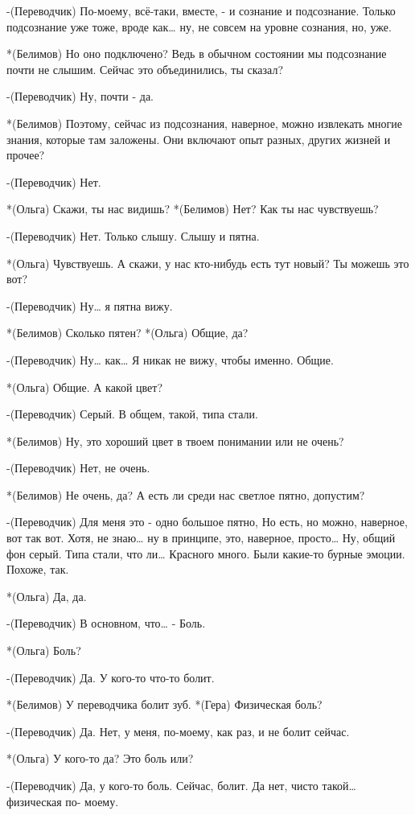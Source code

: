 -(Переводчик) По-моему, всё-таки, вместе, - и сознание и подсознание. Только подсознание уже тоже, вроде как… ну, не совсем на уровне сознания, но, уже.

*(Белимов) Но оно подключено? Ведь в обычном состоянии мы подсознание почти не слышим. Сейчас это объединились, ты сказал?

-(Переводчик) Ну, почти - да.

*(Белимов) Поэтому, сейчас из подсознания, наверное, можно извлекать многие знания, которые там заложены. Они включают опыт разных, других жизней и прочее?

-(Переводчик) Нет.

*(Ольга) Скажи, ты нас видишь?
*(Белимов) Нет? Как ты нас чувствуешь?

-(Переводчик) Нет. Только слышу. Слышу и пятна. 

*(Ольга) Чувствуешь. А скажи, у нас кто-нибудь есть тут новый? Ты можешь это вот?

-(Переводчик) Ну… я пятна вижу. 

*(Белимов) Сколько пятен?
*(Ольга) Общие, да?

-(Переводчик) Ну… как…  Я никак не вижу, чтобы именно. Общие.

*(Ольга) Общие. А какой цвет?

-(Переводчик) Серый.  В общем, такой, типа стали. 

*(Белимов) Ну, это хороший цвет в твоем понимании или не очень?

-(Переводчик) Нет, не очень.

*(Белимов) Не очень, да? А есть ли среди нас светлое пятно, допустим?

-(Переводчик) Для меня это - одно большое пятно, Но есть, но можно, наверное, вот так вот. Хотя, не знаю… ну в принципе, это, наверное, просто… Ну, общий фон серый. Типа стали, что ли… Красного много. Были какие-то бурные эмоции. Похоже, так.

*(Ольга) Да, да.

-(Переводчик) В основном, что… - Боль.

*(Ольга) Боль?

-(Переводчик) Да. У кого-то что-то болит.

*(Белимов) У переводчика болит зуб.
*(Гера) Физическая боль?

-(Переводчик) Да. Нет, у меня, по-моему, как раз, и не болит сейчас.

*(Ольга) У кого-то да? Это боль или?

-(Переводчик) Да, у кого-то боль. Сейчас, болит. Да нет, чисто такой… физическая по- моему.

